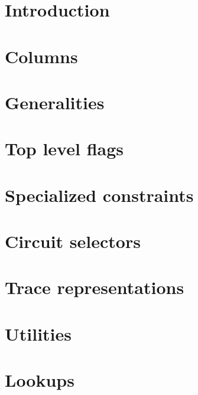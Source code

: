 \section{Introduction                        \lispNone{}}    \label{bls: intro}                      
\section{Columns                             \lispTodo{}}    \label{bls: columns}                    
\section{Generalities                        \lispTodo{}}    \label{bls: generalities}               
\section{Top level flags \locTopLevelFlags{} \lispTodo{}}    \label{bls: top level}                  
\section{Specialized constraints             \lispTodo{}}    \label{bls: specialized constraints}    
\section{Circuit selectors                   \lispTodo{}}    \label{bls: circuit selectors}          
\section{Trace representations               \lispTodo{}}    \label{bls: trace representations}      
\section{Utilities                           \lispTodo{}}    \label{bls: utilities}                  
\section{Lookups                             \lispTodo{}}    \label{bls: lookups}                    
